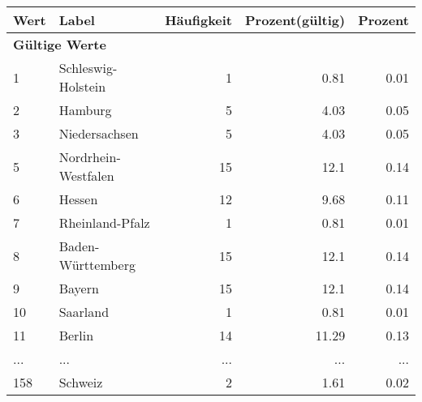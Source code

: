      \begin{longtable}{lXrrr}
     \toprule
     \textbf{Wert} & \textbf{Label} & \textbf{Häufigkeit} & \textbf{Prozent(gültig)} & \textbf{Prozent} \\
     \endhead
     \midrule
     \multicolumn{5}{l}{\textbf{Gültige Werte}}\\
        1 & \multicolumn{1}{X}{Schleswig-Holstein} & %
          \num{1} &
          \num[round-mode=places,round-precision=2]{0,81} &
          \num[round-mode=places,round-precision=2]{0,01} \\
        2 & \multicolumn{1}{X}{Hamburg} & %
          \num{5} &
          \num[round-mode=places,round-precision=2]{4,03} &
          \num[round-mode=places,round-precision=2]{0,05} \\
        3 & \multicolumn{1}{X}{Niedersachsen} & %
          \num{5} &
          \num[round-mode=places,round-precision=2]{4,03} &
          \num[round-mode=places,round-precision=2]{0,05} \\
        5 & \multicolumn{1}{X}{Nordrhein-Westfalen} & %
          \num{15} &
          \num[round-mode=places,round-precision=2]{12,1} &
          \num[round-mode=places,round-precision=2]{0,14} \\
        6 & \multicolumn{1}{X}{Hessen} & %
          \num{12} &
          \num[round-mode=places,round-precision=2]{9,68} &
          \num[round-mode=places,round-precision=2]{0,11} \\
        7 & \multicolumn{1}{X}{Rheinland-Pfalz} & %
          \num{1} &
          \num[round-mode=places,round-precision=2]{0,81} &
          \num[round-mode=places,round-precision=2]{0,01} \\
        8 & \multicolumn{1}{X}{Baden-Württemberg} & %
          \num{15} &
          \num[round-mode=places,round-precision=2]{12,1} &
          \num[round-mode=places,round-precision=2]{0,14} \\
        9 & \multicolumn{1}{X}{Bayern} & %
          \num{15} &
          \num[round-mode=places,round-precision=2]{12,1} &
          \num[round-mode=places,round-precision=2]{0,14} \\
        10 & \multicolumn{1}{X}{Saarland} & %
          \num{1} &
          \num[round-mode=places,round-precision=2]{0,81} &
          \num[round-mode=places,round-precision=2]{0,01} \\
        11 & \multicolumn{1}{X}{Berlin} & %
          \num{14} &
          \num[round-mode=places,round-precision=2]{11,29} &
          \num[round-mode=places,round-precision=2]{0,13} \\
       ... & ... & ... & ... & ... \\
        158 & \multicolumn{1}{X}{Schweiz} & %
          \num{2} &
          \num[round-mode=places,round-precision=2]{1,61} &
          \num[round-mode=places,round-precision=2]{0,02} \\


\end{longtable}
